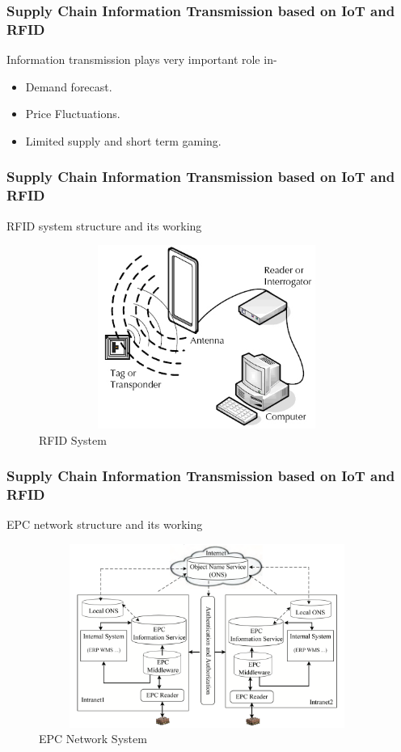 \documentclass{beamer}
\begin{document}
\begin{frame}
\frametitle{Supply Chain Information Transmission based on IoT and RFID}
\begin{block}{Information transmission plays very important role in-}
\begin{itemize}
	\item Demand forecast.
	\item Price Fluctuations.
	\item Limited supply and short term gaming.
\end{itemize}
\end{block}
\end{frame}

\begin{frame}
\frametitle{Supply Chain Information Transmission based on IoT and RFID}
\begin{block}{RFID system structure and its working}
\begin{figure}
\centering
\includegraphics[width=11cm,height=6cm]{RFID}
\caption{RFID System\cite{yan2009supply}}
\end{figure}
\end{block}
\end{frame}


\begin{frame}
\frametitle{Supply Chain Information Transmission based on IoT and RFID}
\begin{block}{EPC network structure and its working}
\begin{figure}
\centering
\includegraphics[width=11cm,height=6cm]{EPC}
\caption{EPC Network System\cite{yan2009supply}}
\end{figure}
\end{block}
\end{frame}
\end{document}
